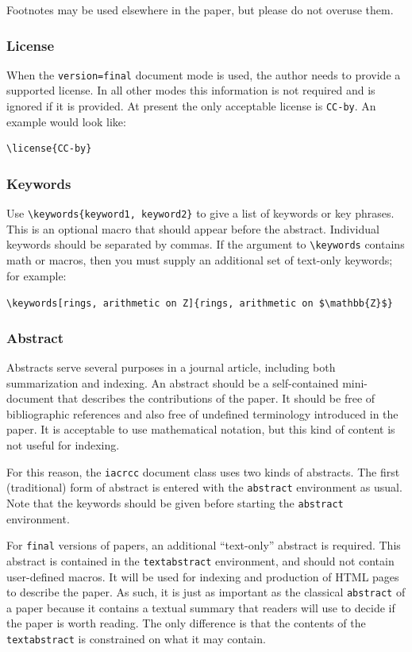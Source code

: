 \documentclass{iacrcc}
\begin{document}
Footnotes may be used elsewhere in the paper, but please do not
overuse them.

\subsubsection{License}
When the \texttt{version=final} document mode is used, the author needs
to provide a supported license.  In all other modes this information
is not required and is ignored if it is provided.  At present the only
acceptable license is \texttt{CC-by}.  An example would look like:

\begin{verbatim}
\license{CC-by}
\end{verbatim}

\subsubsection{Keywords}
Use \texttt{\textbackslash keywords\{keyword1, keyword2\}} to give a
list of keywords or key phrases. This is an optional macro that should
appear before the abstract.  Individual keywords should be separated
by commas. If the argument to \texttt{\textbackslash keywords}
contains math or macros, then you must supply an additional set of
text-only keywords; for example:

\texttt{\textbackslash keywords[rings, arithmetic on Z]\{rings, arithmetic on \$\textbackslash mathbb\{Z\}\$\}}

\subsubsection{Abstract}
Abstracts serve several purposes in a journal article, including both
summarization and indexing. An abstract should be a self-contained
mini-document that describes the contributions of the paper. It
should be free of bibliographic references and also free of undefined
terminology introduced in the paper. It is acceptable to use
mathematical notation, but this kind of content is not useful for
indexing.

For this reason, the \texttt{iacrcc} document class uses two kinds
of abstracts. The first (traditional) form of abstract is entered with the
\texttt{abstract} environment as usual.  Note that the keywords should
be given before starting the \texttt{abstract} environment.

For \texttt{final} versions of papers, an additional ``text-only''
abstract is required. This abstract is contained in the
\texttt{textabstract} environment, and should not contain
user-defined macros.
It will be used for indexing and production of
{HTML} pages to describe the paper. As such, it is just as important
as the classical \texttt{abstract} of a paper because it contains a
textual summary that readers will use to decide if the paper is worth
reading. The only difference is that the contents of the
\texttt{textabstract} is constrained on what it may contain.
\end{document}
